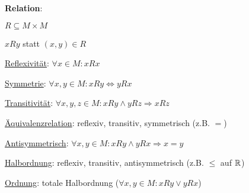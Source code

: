   \textbf{Relation}:
  \begin{items}
    \item $R \subseteq M \times M$
    \item $xRy$ statt $(x,y) \in R$
    \item \underline{Reflexivität}: $\forall x \in M: xRx$
    \item \underline{Symmetrie}: $\forall x,y \in M: xRy \Leftrightarrow yRx$
    \item \underline{Transitivität}: $\forall x,y,z \in M: xRy \wedge yRz \Rightarrow xRz$
    \item \underline{Äquivalenzrelation}: reflexiv, transitiv, symmetrisch (z.B. $=$)
    \item \underline{Antisymmetrisch}: $\forall x,y \in M: xRy \wedge yRx \Rightarrow x=y$
    \item \underline{Halbordnung}: reflexiv, transitiv, antisymmetrisch (z.B. $\leq$ auf $\mathbb{R}$)
    \item \underline{Ordnung}: totale Halbordnung ($\forall x,y \in M: xRy \vee yRx$)
  \end{items}